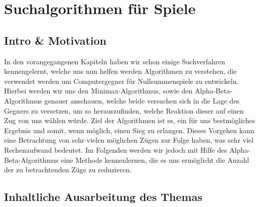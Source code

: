 
\chapter{Suchalgorithmen für Spiele}

\usetikzlibrary{arrows}
\usetikzlibrary{calc}
\usetikzlibrary{positioning}
\usetikzlibrary{matrix}




\section{Intro \& Motivation}

In den vorangegangenen Kapiteln haben wir schon einige Suchverfahren kennengelernt, welche uns nun helfen werden Algorithmen zu verstehen, die verwendet werden um Computergegner für Nullsummenspiele zu entwickeln. Hierbei werden wir uns den Minimax-Algorithmus, sowie den Alpha-Beta-Algorithmus genauer anschauen, welche beide versuchen sich in die Lage des Gegners zu versetzen, um so  herauszufinden, welche Reaktion dieser auf einen Zug von uns wählen würde. Ziel der Algorithmen ist es, ein für uns bestmögliches Ergebnis und somit, wenn möglich, einen Sieg zu erlangen. Dieses Vorgehen kann eine Betrachtung von sehr vielen möglichen Zügen zur Folge haben, was sehr viel Rechenaufwand bedeutet. Im Folgenden werden wir jedoch  mit Hilfe des Alpha-Beta-Algorithmus eine Methode kennenlernen, die es uns ermöglicht die Anzahl der zu betrachtenden Züge zu reduzieren.



\section{Inhaltliche Ausarbeitung des Themas}

